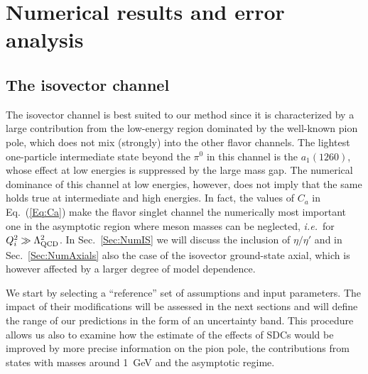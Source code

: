 \section{Numerical results and error analysis}
\label{Sec:Num}
\subsection{The isovector channel}
\label{Sec:NumIV}
The isovector channel is best suited to our method since it is characterized by a large contribution from the low-energy region dominated by the well-known pion pole, which does not mix (strongly) into the other flavor channels. The lightest one-particle intermediate state beyond the $\pi^0$ in this channel is the $a_1(1260)$, whose effect at low energies is suppressed by the large mass gap. The numerical dominance of this channel at low energies, however, does not imply that the same holds true at intermediate and high energies. In fact, the values of $C_a$ in Eq.~(\ref{Eq:Ca}) make the flavor singlet channel the numerically most important one in the asymptotic region where meson masses can be neglected, {\it i.e.}\ for $Q_i^2 \gg \Lambda_\text{QCD}^2$. In Sec.~\ref{Sec:NumIS} we will discuss the inclusion of $\eta/\eta'$ and in Sec.~\ref{Sec:NumAxials} also the case of the isovector ground-state axial, which is however affected by a larger degree of model dependence.

We start by selecting a \enquote{reference} set of assumptions and input parameters. The impact of their modifications will be assessed in the next sections and will define the range of our predictions in the form of an uncertainty band. This procedure allows us also to examine how the estimate of the effects of SDCs would be improved by more precise information on the pion pole, the contributions from states with masses around \SI{1}{\GeV} and the asymptotic regime.

